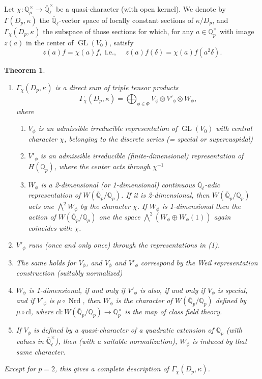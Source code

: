 \documentclass[11pt,a4paper]{article}
\theoremstyle{plain}
\newtheorem{theorem}{Theorem}[section]
\theoremstyle{definition}
\theoremstyle{remark}
\DeclareMathOperator{\GL}{GL}
\DeclareMathOperator{\Nrd}{Nrd}
\newcommand{\Qpbar}{\overline{\mathbb{Q}}_{p}}
\newcommand{\Qp}{\mathbb{Q}_{p}}
\newcommand{\Qlbar}{\overline{\mathbb{Q}}_{\ell}}
\begin{document}
Let $\chi : \Qp^{\times} \to \Qlbar^{\times}$ be a quasi-character (with open kernel). We denote by $\Gamma(D_{p}, \kappa)$ the $\Qlbar$-vector space of locally constant sections of $\kappa/D_{p}$, and $\Gamma_{\chi}(D_{p}, \kappa)$ the subspace of those sections for which, for any $a \in \Qp^{\times}$ with image $z(a)$ in the center of $\GL(V_{0})$, satisfy
\[
z(a)f = \chi(a)f, \text{ i.e., } \quad z(a)f(\delta) = \chi(a)f(a^{2}\delta).
\]

\begin{theorem}
\begin{enumerate}[label=(\roman*)]
\item $\Gamma_{\chi}(D_{p}, \kappa)$ is a direct sum of triple tensor products
\[
\Gamma_{\chi}(D_{p}, \kappa) = \bigoplus_{\phi \in \Phi} V_{\phi} \otimes V'_{\phi} \otimes W_{\phi},
\]
where
\begin{enumerate}[label=(\alph*)]
\item $V_{\phi}$ is an admissible irreducible representation of $\GL(V_{0})$ with central character $\chi$, belonging to the discrete series (= special or supercuspidal)
\item $V'_{\phi}$ is an admissible irreducible (finite-dimensional) representation of $H(\Qp)$, where the center acts through $\chi^{-1}$
\item $W_{\phi}$ is a 2-dimensional (or 1-dimensional) continuous $\Qlbar$-adic representation of $W(\Qpbar/\Qp)$. If it is 2-dimensional, then $W(\Qpbar/\Qp)$ acts one $\bigwedge^{2} W_{\phi}$ by the character $\chi$. If $W_{\phi}$ is 1-dimensional then the action of $W(\Qpbar/\Qp)$ one the space $\bigwedge^{2}(W_{\phi} \oplus W_{\phi}(1))$ again coincides with $\chi$.
\end{enumerate}
\item $V'_{\phi}$ runs (once and only once) through the representations in (1).
\item The same holds for $V_{\phi}$, and $V_{\phi}$ and $V'_{\phi}$ correspond by the Weil representation construction (suitably normalized)
\item $W_{\phi}$ is 1-dimensional, if and only if $V'_{\phi}$ is also, if and only if $V_{\phi}$ is special, and if $V'_{\phi}$ is $\mu \circ \Nrd$, then $W_{\phi}$ is the character of $W(\Qpbar/\Qp)$ defined by $\mu \circ \mathrm{cl}$, where $\mathrm{cl} : W(\Qpbar/\Qp) \to \Qp^{\times}$ is the map of class field theory.
\item If $V_{\phi}$ is defined by a quasi-character of a quadratic extension of $\Qp$ (with values in $\Qlbar^{\times}$), then (with a suitable normalization), $W_{\phi}$ is induced by that same character.
\end{enumerate}
Except for $p = 2$, this gives a complete description of $\Gamma_{\chi}(D_{p}, \kappa)$.
\end{theorem}
\end{document}
